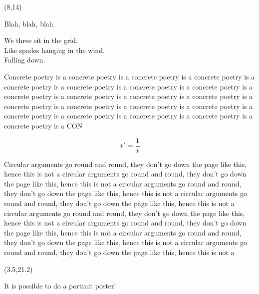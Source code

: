 \documentclass[a0,portrait]{a0poster}
\def\LHead#1{\noindent{\LARGE\color{DarkBlue} #1}\smallskip}
\begin{document}
\begin{textblock}{7}(8,14)
  \LHead{Introduction}
  
  Blah, blah, blah.

  We three sit in the grid.\\
  Like spades hanging in the wind.\\
  Falling down.

  Concrete poetry is a concrete poetry is a concrete poetry is a 
  concrete poetry is a concrete poetry is a concrete poetry is a 
  concrete poetry is a concrete poetry is a concrete poetry is a 
  concrete poetry is a concrete poetry is a concrete poetry is a 
  concrete poetry is a concrete poetry is a concrete poetry is a 
  concrete poetry is a concrete poetry is a concrete poetry is a 
  concrete poetry is a concrete poetry is a concrete poetry is a 
  CON

  \[
  x' = \frac{1}{x}
  \]

  Circular arguments go round and round, they don't go down the page
  like this, hence this is not a circular arguments go round and round, they don't go down the page
  like this, hence this is not a circular arguments go round and round, they don't go down the page
  like this, hence this is not a circular arguments go round and round, they don't go down the page
  like this, hence this is not a circular arguments go round and round, they don't go down the page
  like this, hence this is not a circular arguments go round and round, they don't go down the page
  like this, hence this is not a circular arguments go round and round, they don't go down the page
  like this, hence this is not a circular arguments go round and round, they don't go down the page
  like this, hence this is not a 

\end{textblock}





\begin{textblock}{9}(3.5,21.2)
\LHead{Conclusions}

It is possible to do a portrait poster!

\end{textblock}
\end{document}
